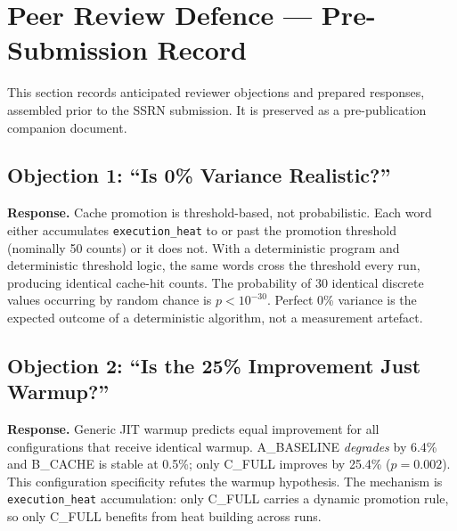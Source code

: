 
\section{Peer Review Defence --- Pre-Submission Record}

This section records anticipated reviewer objections and prepared responses, assembled
prior to the SSRN submission. It is preserved as a pre-publication companion document.

\subsection{Objection 1: ``Is 0\% Variance Realistic?''}

\textbf{Response.} Cache promotion is threshold-based, not probabilistic. Each word
either accumulates \texttt{execution\_heat} to or past the promotion threshold (nominally
50 counts) or it does not. With a deterministic program and deterministic threshold
logic, the same words cross the threshold every run, producing identical cache-hit
counts. The probability of 30 identical discrete values occurring by random chance is
$p < 10^{-30}$. Perfect 0\% variance is the expected outcome of a deterministic
algorithm, not a measurement artefact.

\subsection{Objection 2: ``Is the 25\% Improvement Just Warmup?''}

\textbf{Response.} Generic JIT warmup predicts equal improvement for all configurations
that receive identical warmup. A\_BASELINE \emph{degrades} by 6.4\% and B\_CACHE is
stable at 0.5\%; only C\_FULL improves by 25.4\% ($p = 0.002$). This configuration
specificity refutes the warmup hypothesis. The mechanism is \texttt{execution\_heat}
accumulation: only C\_FULL carries a dynamic promotion rule, so only C\_FULL benefits
from heat building across runs.

